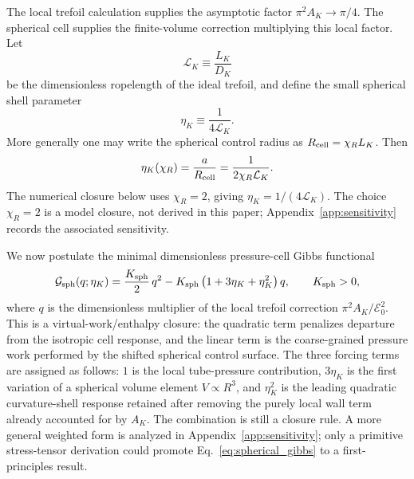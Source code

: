 \documentclass[aps,pra,preprint,longbibliography,nofootinbib]{revtex4-2}
\newcommand{\Et}{\mathcal{E}_0}                    %
\newcommand{\LK}{\mathcal{L}_K}                     %
\newcommand{\AK}{A_K}                                %
\newcommand{\chiR}{\chi_R}                         %
\begin{document}
The local trefoil calculation supplies the asymptotic factor
$\pi^2\AK\to\pi/4$.  The spherical cell supplies the finite-volume
correction multiplying this local factor.  Let
\begin{equation}
  \LK\equiv \frac{L_K}{D_K}
  \label{eq:ropelength_def}
\end{equation}
be the dimensionless ropelength of the ideal trefoil, and define the
small spherical shell parameter
\begin{equation}
  \eta_K\equiv\frac{1}{4\LK}.
  \label{eq:etaK_def}
\end{equation}
More generally one may write the spherical control radius as
$R_{\rm cell}=\chiR L_K$.  Then
\begin{equation}
  \eta_K(\chiR)=\frac{a}{R_{\rm cell}}
  =\frac{1}{2\chiR\LK} .
  \label{eq:etaK_chiR}
\end{equation}
The numerical closure below uses $\chiR=2$, giving
$\eta_K=1/(4\LK)$.  The choice $\chiR=2$ is a model closure, not derived
in this paper; Appendix~\ref{app:sensitivity} records the associated
sensitivity.

We now postulate the minimal dimensionless pressure-cell Gibbs functional
\begin{equation}
  \mathcal G_{\rm sph}(q;\eta_K)
  = \frac{K_{\rm sph}}{2}\,q^2
    -K_{\rm sph}\left(1+3\eta_K+\eta_K^2\right)q,
  \qquad K_{\rm sph}>0,
  \label{eq:spherical_gibbs}
\end{equation}
where $q$ is the dimensionless multiplier of the local trefoil correction
$\pi^2\AK/\Et^2$.  This is a virtual-work/enthalpy closure: the quadratic
term penalizes departure from the isotropic cell response, and the linear
term is the coarse-grained pressure work performed by the shifted spherical
control surface.  The three forcing terms are assigned as follows: $1$ is
the local tube-pressure contribution, $3\eta_K$ is the first variation of
a spherical volume element $V\propto R^3$, and $\eta_K^2$ is the leading
quadratic curvature-shell response retained after removing the purely
local wall term already accounted for by $\AK$.  The combination is still a
closure rule.  A more general weighted form is analyzed in
Appendix~\ref{app:sensitivity}; only a primitive stress-tensor derivation
could promote Eq.~\eqref{eq:spherical_gibbs} to a first-principles result.
\end{document}
